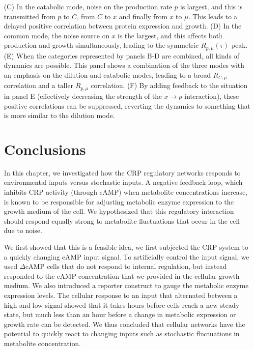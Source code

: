 {	(C) In the catabolic mode, noise on the production rate $p$ is largest, and this is transmitted from $p$ to $C$, from $C$ to $x$ and finally from $x$ to $\mu$. This leads to a delayed positive correlation between protein expression and growth.
	(D) In the common mode, the noise source on $x$ is the largest, and this affects both production and growth simultaneously, leading to the symmetric $R_{p,\mu}(\tau)$ peak. 
	(E) When the categories represented by panels B-D are combined, all kinds of dynamics are possible. This panel shows a combination of the three modes with an emphasis on the dilution and catabolic modes, leading to a broad $R_{C,\mu}$ correlation and a taller $R_{p,\mu}$ correlation.
	(F) By adding feedback to the situation in panel E (effectively decreasing the strength of the ${x}\rightarrow{p}$ interaction), these positive correlations can be suppressed, reverting the dynamics to something that is more similar to the dilution mode.
}










\section*{Conclusions}

In this chapter, 
we investigated how the CRP regulatory networks responds to environmental inputs versus stochastic inputs.
%
A negative feedback loop, which inhibits CRP activity (through cAMP) 
when metabolite concentrations increase,
is known to be responsible for adjusting metabolic enzyme expression to the growth medium of the cell.
%
We hypothesized that this regulatory interaction should respond equally strong to metabolite fluctuations that occur in the cell due to noise. 

We first showed that 
this is a feasible idea, we first subjected the CRP system to a quickly changing cAMP input signal.
To artificially control the input signal, we used $\Delta$cAMP cells that do not respond to internal regulation, but instead responded to the cAMP concentration that we provided in the cellular growth medium.
We also introduced a reporter construct to gauge the metabolic enzyme expression levels.
%
The cellular response to an input that alternated between a high and low signal showed that 
it takes hours before cells reach a new steady state, but much less than an hour before a change in metabolic expression or growth rate can be detected.
%
We thus concluded that cellular networks have the potential to quickly react to changing inputs such as stochastic fluctuations in metabolite concentration.


